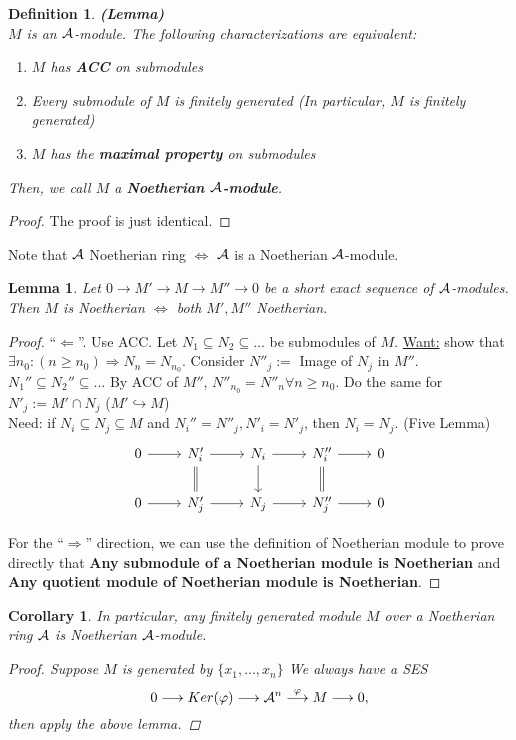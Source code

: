 \documentclass[11pt]{article}
\newtheorem{lemma}[thm]{Lemma}
\newtheorem{cor}[thm]{Corollary}
\newtheorem{dfn}[thm]{Definition}
\newcommand{\cala}{{\cal A}}
\newcommand{\Lrta}{\Longrightarrow}
\newcommand{\lrta}{\longrightarrow}
\newcommand{\Llta}{\Longleftarrow}
\newcommand{\Llrta}{\Longleftrightarrow}
\newcommand{\inj}{\hookrightarrow}
\begin{document}
\begin{dfn}\textbf{(Lemma)}\\
$M$ is an $\cala$-module. The following characterizations are equivalent:
\begin{enumerate}[label=(\alph*)]
\item $M$ has \textbf{ACC} on submodules
\item Every submodule of $M$ is finitely generated (In particular, $M$ is finitely generated)
\item $M$ has the \textbf{maximal property} on submodules
\end{enumerate}
Then, we call $M$ a \textbf{Noetherian $\cala$-module}.
\end{dfn}
\begin{proof}
The proof is just identical.
\end{proof}

Note that $\cala$ Noetherian ring $\Llrta $ $\cala$ is a Noetherian $\cala$-module.

\begin{lemma}\label{lem:SES_Noetherian}
Let $0\lrta M'\lrta M\lrta M''\lrta 0$ be a short exact sequence of $\cala$-modules. Then $M$ is Noetherian $\Llrta $ both $M', M''$ Noetherian.
\end{lemma}
\begin{proof}
``$\Llta$''. Use ACC. Let $N_1\subseteq N_2\subseteq ...$ be submodules of $M$. \underline{Want:}  show that $\exists n_0 :(n\geq n_0)\Lrta N_n=N_{n_0}$.
Consider $N''_j:=$ Image of $N_j$ in $M''$. $ N_1''\subseteq N_2''\subseteq ...$ By ACC of $M''$, $N''_{n_0}=N''_{n}\forall n\geq n_0$. Do the same for $N'_j:=M'\cap N_j$ ($M'\inj M$)\\
Need: if $N_i\subseteq N_j\subseteq M$ and $N_i''=N''_j, N'_i=N'_j$, then $N_i=N_j$. (Five Lemma)
\[
\begin{tikzcd}
0\ar[r] & N_i'\ar[r]\ar[d,equal] & N_i\ar[r]\ar[d] & N_i''\ar[r]\ar[d,equal] & 0\\
0\ar[r] & N_j'\ar[r] & N_j\ar[r] & N_j''\ar[r] & 0
\end{tikzcd}
\]

For the ``$\Lrta$'' direction, we can use the definition of Noetherian module to prove directly that \textbf{Any submodule of a Noetherian module is Noetherian} and \textbf{Any quotient module of Noetherian module is Noetherian}.
\end{proof}

\begin{cor}\label{cor:finitely_generated_module_over_Noetherian_ring}
In particular, any finitely generated module $M$ over a Noetherian ring $\cala$ is Noetherian $\cala$-module.
\begin{proof}Suppose $M$ is generated by $\{x_1,...,x_n\}$
We always have a SES
$$
0\lrta Ker(\varphi)\lrta \cala^n\overset{\varphi}{\lrta} M\lrta 0,
$$
then apply the above lemma.
\end{proof}
\end{cor}
\end{document}

